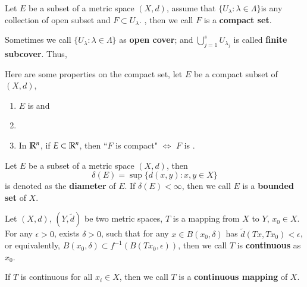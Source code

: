 \begin{definition}\label{def:1.7}
    Let $E$ be a subset of a metric space $(X, d)$, assume that $\{U_{\lambda}: \lambda \in \Lambda\}$is any collection of open subset and $F \subset U_{\lambda}$. , then we call $F$ is a \textbf{compact set}.
    
    Sometimes we call $\{U_{\lambda}: \lambda \in \Lambda\}$ as \textbf{open cover}; and $\bigcup_{j=1}^{s} U_{\lambda_j}$ is called \textbf{finite subcover}. Thus, 
\end{definition}
\begin{Remark}
Here are some properties on the compact set, let $E$ be a compact subset of $(X, d)$,
\begin{enumerate}[itemsep=0pt, topsep=0pt]
    \item $E$ is  and 
    \item {}
    \item In $\mathbb{R}^n$, if $E \subset \mathbb{R}^n$, then ``$F$ is compact" $\Leftrightarrow$ $F$ is .
\end{enumerate}
\end{Remark}

\begin{definition}\label{def:1.8}
    Let $E$ be a subset of a metric space $(X, d)$, then 
    $$\delta(E) = \sup\{d(x, y): x,y\in X\}$$
    is denoted as the \textbf{diameter} of $E$. If $\delta(E) < \infty$, then we call $E$ is a \textbf{bounded set} of $X$.
\end{definition}

\begin{definition}\label{def:1.9}
    Let $(X, d)$, $(Y, \tilde{d})$ be two metric spaces, $T$ is a mapping from $X$ to $Y$, $x_0 \in X$. For any $\epsilon > 0$, exists $\delta > 0$, such that for any $x \in B(x_0, \delta)$ has $\tilde{d}(Tx, Tx_0) < \epsilon$, or equivalently, $B(x_0, \delta) \subset f^{-1}\left(B(Tx_0, \epsilon)\right)$, then we call $T$ is \textbf{continuous} as $x_0$.
    
    If $T$ is continuous for all $x_i \in X$, then we call $T$ is a \textbf{continuous mapping} of $X$.
\end{definition}

